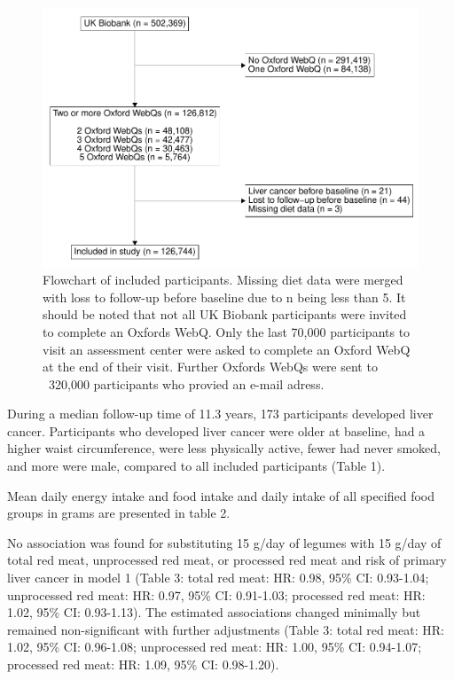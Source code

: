 \documentclass[sn-basic,Numbered,pdflatex]{sn-jnl}
\begin{document}
\begin{figure}[b]
\includegraphics[width=1\linewidth,]{Springer-test_files/figure-latex/fig1-1} \caption{Flowchart of included participants. Missing diet data were merged with loss to follow-up before baseline due to n being less than 5. It should be noted that not all UK Biobank participants were invited to complete an Oxfords WebQ. Only the last 70,000 participants to visit an assessment center were asked to complete an Oxford WebQ at the end of their visit. Further Oxfords WebQs were sent to ~320,000 participants who provied an e-mail adress.}\label{fig:fig1}
\end{figure}

During a median follow-up time of 11.3 years, 173 participants developed
liver cancer. Participants who developed liver cancer were older at
baseline, had a higher waist circumference, were less physically active,
fewer had never smoked, and more were male, compared to all included
participants (Table 1).

Mean daily energy intake and food intake and daily intake of all
specified food groups in grams are presented in table 2.

No association was found for substituting 15 g/day of legumes with 15
g/day of total red meat, unprocessed red meat, or processed red meat and
risk of primary liver cancer in model 1 (Table 3: total red meat:
HR: 0.98, 95\% CI: 0.93-1.04;
unprocessed red meat:
HR: 0.97, 95\% CI: 0.91-1.03;
processed red meat:
HR: 1.02, 95\% CI: 0.93-1.13).
The estimated associations changed minimally but remained
non-significant with further adjustments (Table 3: total red meat:
HR: 1.02, 95\% CI: 0.96-1.08;
unprocessed red meat:
HR: 1.00, 95\% CI: 0.94-1.07;
processed red meat:
HR: 1.09, 95\% CI: 0.98-1.20).
\end{document}
